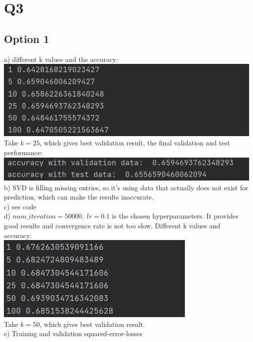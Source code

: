 \documentclass[12pt]{article}
\begin{document}
	\section*{Q3}
	\subsection*{Option 1}
	a) different k values and the accuracy:\\
	\includegraphics[scale=0.8]{a31}\\
	Take $k=25$, which gives best validation result, the final validation and test performance:\\
	\includegraphics[scale=0.8]{a31(2)}\\
	b) SVD is filling missing entries, so it's using data that actually does not exist for prediction, which can make the results inaccurate.\\
	c) see code\\
	d) $num\_iteration=50000,\;lr=0.1$ is the chosen hyperparameters. It provides good results and convergence rate is not too slow. Different k values and accuracy:\\
	\includegraphics[scale=0.8]{a33}\\
	Take $k=50$, which gives best validation result.\\
	e) Training and validation squared-error-losses\\
\end{document}
